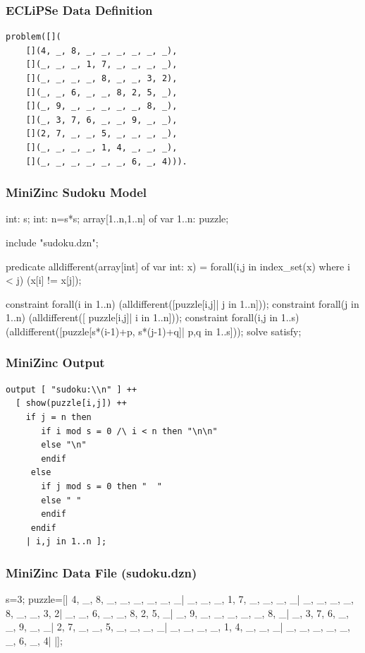 \begin{frame}[fragile]
\frametitle{ECLiPSe Data Definition}
\tiny
\begin{verbatim}
problem([](
    [](4, _, 8, _, _, _, _, _, _),
    [](_, _, _, 1, 7, _, _, _, _),
    [](_, _, _, _, 8, _, _, 3, 2),
    [](_, _, 6, _, _, 8, 2, 5, _),
    [](_, 9, _, _, _, _, _, 8, _),
    [](_, 3, 7, 6, _, _, 9, _, _),
    [](2, 7, _, _, 5, _, _, _, _),
    [](_, _, _, _, 1, 4, _, _, _),
    [](_, _, _, _, _, _, 6, _, 4))).
\end{verbatim}
\hyperlink{sudoku:continue}{}
\end{frame}



\begin{frame}[fragile]
\frametitle{MiniZinc Sudoku Model}
\label{sudoku:minizinc}
\tiny
\begin{semiverbatim}
int: s;
int: n=s*s;
array[1..n,1..n] of var 1..n: puzzle;

include "sudoku.dzn";

predicate alldifferent(array[int] of var int: x) =
  forall(i,j in index_set(x) where i < j)
    (x[i] != x[j]); 
    
constraint forall(i in 1..n)
    (alldifferent([puzzle[i,j]| j in 1..n]));
constraint forall(j in 1..n)
    (alldifferent([ puzzle[i,j]| i in 1..n]));
constraint forall(i,j in 1..s)
    (alldifferent([puzzle[s*(i-1)+p, s*(j-1)+q]|
                  p,q in 1..s]));
solve satisfy;
\end{semiverbatim}
\end{frame}

\begin{frame}[fragile]
\frametitle{MiniZinc Output}
\tiny
\begin{verbatim}
output [ "sudoku:\\n" ] ++
  [ show(puzzle[i,j]) ++
    if j = n then
       if i mod s = 0 /\ i < n then "\n\n"
       else "\n"
       endif
     else
       if j mod s = 0 then "  "
       else " "
       endif
     endif
    | i,j in 1..n ];
\end{verbatim}
\end{frame}

\begin{frame}[fragile]
\frametitle{MiniZinc Data File {\tiny(sudoku.dzn)}}
\tiny
\begin{semiverbatim}
s=3;
puzzle=[|
    4, _, 8, _, _, _, _, _, _|
    _, _, _, 1, 7, _, _, _, _|
    _, _, _, _, 8, _, _, 3, 2|
    _, _, 6, _, _, 8, 2, 5, _|
    _, 9, _, _, _, _, _, 8, _|
    _, 3, 7, 6, _, _, 9, _, _|
    2, 7, _, _, 5, _, _, _, _|
    _, _, _, _, 1, 4, _, _, _|
    _, _, _, _, _, _, 6, _, 4|
|];
\end{semiverbatim}
\hyperlink{sudoku:continue}{}
\end{frame}

